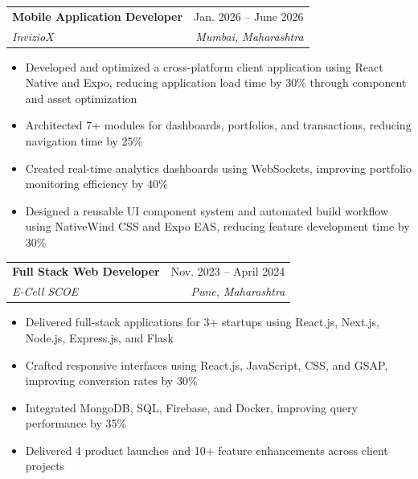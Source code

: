 \documentclass[letterpaper,11pt]{article}
\makeatletter
\newcommand{\resumeItem}[1]{
    \item\small{#1}
}
\newcommand{\resumeSubheading}[4]{
    \item
    \begin{tabular*}{0.97\textwidth}[t]{l@{\extracolsep{\fill}}r}
        \textbf{#1} & #2 \\
        \textit{\small#3} & \textit{\small#4} \\
    \end{tabular*}
}
\newcommand{\resumeSubSubheading}[2]{
    \item
    \begin{tabular*}{0.97\textwidth}{l@{\extracolsep{\fill}}r}
        \textit{\small#1} & \textit{\small#2} \\
    \end{tabular*}
}
\newcommand{\resumeSubHeadingListEnd}{
    \end{itemize}
}
\newcommand{\resumeItemListStart}{
    \begin{itemize}[
        leftmargin=0.18in,
        topsep=0pt,
        partopsep=0pt,
        parsep=0pt,
        itemsep=0pt
    ]
}
\newcommand{\resumeItemListEnd}{
    \end{itemize}
}
\makeatother
\begin{document}
    \resumeSubheading
      {Mobile Application Developer}{Jan. 2026 -- June 2026}
      {InvizioX}{Mumbai, Maharashtra}
      \resumeItemListStart
        \resumeItem{Developed and optimized a cross-platform client application using React Native and Expo, reducing application load time by 30\% through component and asset optimization}
        \resumeItem{Architected 7+ modules for dashboards, portfolios, and transactions, reducing navigation time by 25\%}
        \resumeItem{Created real-time analytics dashboards using WebSockets, improving portfolio monitoring efficiency by 40\%}
        \resumeItem{Designed a reusable UI component system and automated build workflow using NativeWind CSS and Expo EAS, reducing feature development time by 30\%}
      \resumeItemListEnd
      


    \resumeSubheading
      {Full Stack Web Developer}{Nov. 2023 -- April 2024}
      {E-Cell SCOE}{Pune, Maharashtra}
      \resumeItemListStart
        \resumeItem{Delivered full-stack applications for 3+ startups using React.js, Next.js, Node.js, Express.js, and Flask}
        \resumeItem{Crafted responsive interfaces using React.js, JavaScript, CSS, and GSAP, improving conversion rates by 30\%}
        \resumeItem{Integrated MongoDB, SQL, Firebase, and Docker, improving query performance by 35\%}
        \resumeItem{Delivered 4 product launches and 10+ feature enhancements across client projects}
      \resumeItemListEnd
\end{document}

